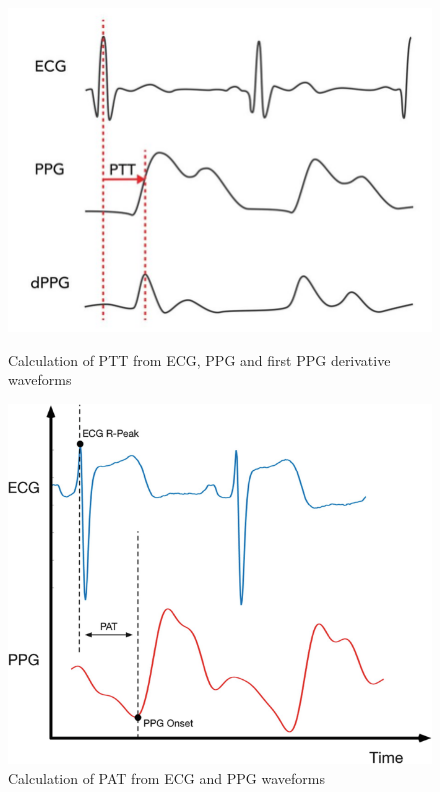 \begin{figure}[h]
    \centering
    \begin{minipage}{0.42\textwidth}
        \centering
        \includegraphics[width=\linewidth]{images/sp/ptt}
        \captionsetup{format=plain, justification=centering, font=small}
        \caption{Calculation of PTT from ECG, PPG and first PPG derivative waveforms~\cite{luiNovelCalibrationProcedure2018}}
        \label{fig:ptt}
    \end{minipage}\hfill
    \begin{minipage}{0.42\textwidth}
        \centering
        \includegraphics[width=\linewidth]{images/sp/pat}
        \captionsetup{format=plain, justification=centering, font=small}
        \caption{Calculation of PAT from ECG and PPG waveforms~\cite{dhillonPulseArrivalTime2019}}
        \label{fig:pat}
    \end{minipage}
\end{figure}

